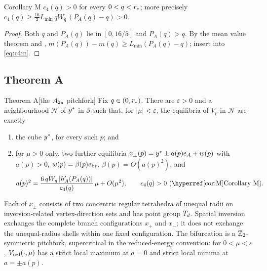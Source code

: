 \begin{named}{Corollary M}\label{cor:M}
$c_4(q)>0$ for every $0<q<r_{*}$; more precisely $c_4(q)\ge\frac{16}{3}L_{\min}\,qW_q\,(P_A(q)-q)>0$.
\end{named}
\begin{proof}
Both $q$ and $P_A(q)$ lie in $[0,16/5]$ and $P_A(q)>q$. By the mean value theorem and \lemM,
$m(P_A(q))-m(q)\ge L_{\min}(P_A(q)-q)$; insert into \eqref{eq:c4m}.
\end{proof}

\subsection{Theorem A}

\begin{named}{Theorem A}[the $A_{2u}$ pitchfork]\label{thm:A}
Fix $q\in(0,r_{*})$. There are $\varepsilon>0$ and a neighbourhood $\mathcal N$ of $y^{*}$ in $\mathcal S$ such that,
for $|\mu|<\varepsilon$, the equilibria of $V_p$ in $\mathcal N$ are exactly
\begin{enumerate}[label=(\arabic*)]
\item the cube $y^{*}$, for every such $p$; and
\item for $\mu>0$ only, two further equilibria $x_\pm(p)=y^{*}\pm a(p)e_{A}+w(p)$ with $a(p)>0$,
$w(p)=\beta(p)e_{\mathrm{br}}$, $\beta(p)=O(a(p)^2)$, and
\begin{equation}\label{eq:ampA}
a(p)^2=\frac{6\,qW_q\,|h_A'(P_A(q))|}{c_4(q)}\,\mu+O(\mu^2),\qquad c_4(q)>0\ \text{(\corM)}.
\end{equation}
\end{enumerate}
Each of $x_\pm$ consists of two concentric regular tetrahedra of unequal radii on inversion-related vertex-direction
sets and has point group $T_{d}$. Spatial inversion exchanges the complete branch configurations $x_+$ and $x_-$; it does
not exchange the unequal-radius shells within one fixed configuration. The bifurcation is a $\mathbb{Z}_2$-symmetric
pitchfork, supercritical in the reduced-energy convention: for $0<\mu<\varepsilon$, $V_{\mathrm{red}}(\cdot,\mu)$ has a strict
local maximum at $a=0$ and strict local minima at $a=\pm a(p)$.
\end{named}

